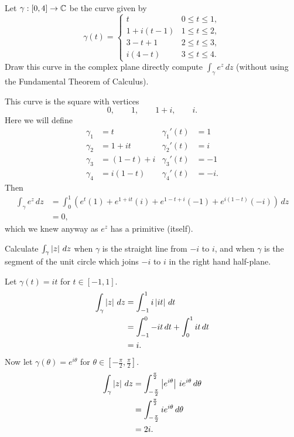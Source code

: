 
\question Let $\gamma: [0,4] \to \mathbb{C}$ be the curve given by
\[
    \gamma(t) =
    \begin{cases}
        t & 0 \leq t \leq 1, \\
        1 + i(t-1) & 1 \leq t \leq 2, \\
        3 - t + 1 & 2 \leq t \leq 3, \\
        i(4-t) & 3 \leq t \leq 4.
    \end{cases}
\]
Draw this curve in the complex plane directly compute $\int_\gamma e^z \,dz$
(without using the Fundamental Theorem of Calculus).
\begin{solution}
    This curve is the square with vertices
    \[
        0, \qquad 1, \qquad 1 + i, \qquad i.
    \]
    Here we will define
    \begin{align*}
        \gamma_1 &= t         & \gamma_1'(t) &= 1  \\
        \gamma_2 &= 1 + it    & \gamma_2'(t) &= i  \\
        \gamma_3 &= (1-t) + i & \gamma_3'(t) &= -1 \\
        \gamma_4 &= i(1-t)    & \gamma_4'(t) &= -i.
    \end{align*}
    Then
    \begin{align*}
        \int_\gamma e^z \,dz
        &= \int_0^1 
        \left( 
            e^t (1)
            + e^{1 + it} (i)
            + e^{1 - t + i} (-1)
            + e^{i(1-t)} (-i)
        \right)
        \,dz \\
        &= 0,
    \end{align*}
    which we knew anyway as $e^z$ has a primitive (itself).
\end{solution}

\question Calculate $\int_\gamma \left\lvert z\right\rvert \,dz$ when $\gamma$ is the
straight line from $-i$ to $i$, and when $\gamma$ is the segment of the unit circle
which joins $-i$ to $i$ in the right hand half-plane.
\begin{solution}
    Let $\gamma(t) = it$ for $t \in [-1,1]$.
    \begin{align*}
        \int_\gamma \left\lvert z\right\rvert \,dz
        &= \int_{-1}^1 i\left\lvert it\right\rvert \,dt \\
        &= \int_{-1}^0 -it \,dt + \int_0^1 it \,dt \\
        &= i.
    \end{align*}
    Now let $\gamma(\theta) = e^{i\theta}$ for 
    $\theta \in \left[-\frac{\pi}2, \frac{\pi}2\right]$.
    \begin{align*}
        \int_\gamma \left\lvert z\right\rvert \,dz
        &= \int_{-\frac{\pi}2}^{\frac\pi2} \left\lvert e^{i\theta}\right\rvert \, ie^{i\theta} \,d\theta \\
        &= \int_{-\frac{\pi}2}^{\frac\pi2} ie^{i\theta} \,d\theta \\
        &= 2i.
    \end{align*}
\end{solution}

